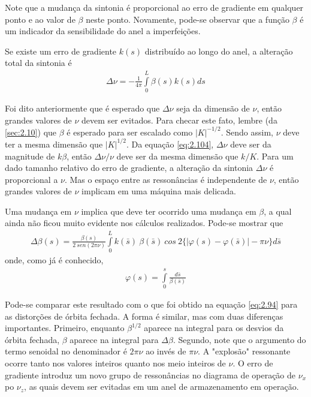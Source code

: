 Note que a mudança da sintonia é proporcional ao erro de gradiente em qualquer ponto e ao valor de $\beta$ neste ponto. Novamente, pode-se observar que a função $\beta$ é um indicador da sensibilidade do anel a imperfeições.

Se existe um erro de gradiente $k(s)$ distribuído ao longo do anel, a alteração total da sintonia é
\begin{align}
	\Delta \nu = -\frac{1}{4\pi} \int\limits_{0}^{L}\beta(s)k(s)ds\label{eq:2.104}
\end{align}

Foi dito anteriormente que é esperado que $\Delta \nu$ seja da dimensão de $\nu$, então grandes valores de $\nu$ devem ser evitados. Para checar este fato, lembre (da \autoref{sec:2.10}) que $\beta$ é esperado para ser escalado como $|K|^{-1/2}$. Sendo assim, $\nu$ deve ter a mesma dimensão que $|K|^{1/2}$. Da equação \eqref{eq:2.104}, $\Delta \nu$ deve ser da magnitude de $k\beta$, então $\Delta \nu/\nu$ deve ser da mesma dimensão que $k/K$. Para um dado tamanho relativo do erro de gradiente, a alteração da sintonia $\Delta \nu$ é proporcional a $\nu$. Mas o espaço entre as ressonâncias é independente de $\nu$, então grandes valores de $\nu$ implicam em uma máquina mais delicada.

Uma mudança em $\nu$ implica que deve ter ocorrido uma mudança em $\beta$, a qual ainda não ficou muito evidente nos cálculos realizados. Pode-se mostrar que
\begin{align}
	\Delta \beta(s) = \frac{\beta(s)}{2\ sen(2\pi\nu)}\int\limits_{0}^{L}k(\bar{s})\ \beta(\bar{s})\ cos\ 2\{|\varphi(s)-\varphi(\bar{s})|-\pi\nu\}d\bar{s}\label{eq:2.105}
\end{align}
onde, como já é conhecido,
\begin{align}
	\varphi(s) = \int\limits_{0}^{s}\frac{d\bar{s}}{\beta(\bar{s})}
\end{align}

Pode-se comparar este resultado com o que foi obtido na equação \eqref{eq:2.94} para as distorções de órbita fechada. A forma é similar, mas com duas diferenças importantes. Primeiro, enquanto $\beta^{1/2}$ aparece na integral para os desvios da órbita fechada, $\beta$ aparece na integral para $\Delta \beta$. Segundo, note que o argumento do termo senoidal no denominador é $2\pi\nu$ ao invés de $\pi\nu$. A "explosão" ressonante ocorre tanto nos valores inteiros quanto nos meio inteiros de $\nu$. O erro de gradiente introduz um novo grupo de ressonâncias no diagrama de operação de $\nu_x$ po $\nu_z$, as quais devem ser evitadas em um anel de armazenamento em operação.

